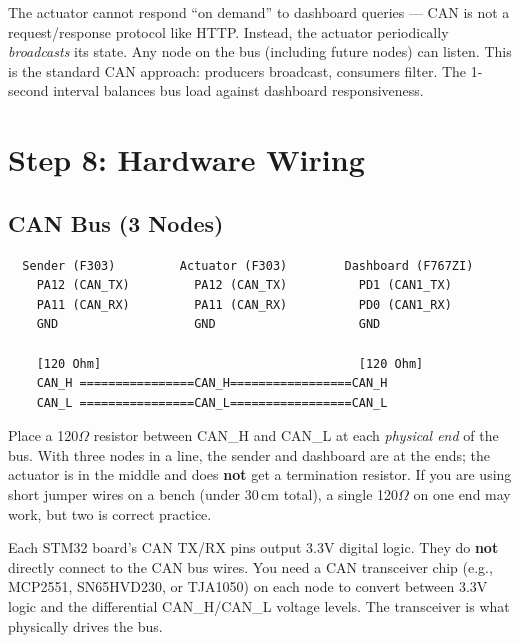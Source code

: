 \documentclass[11pt,a4paper]{article}
\begin{document}
\begin{infobox}
The actuator cannot respond ``on demand'' to dashboard queries --- CAN is not a request/response protocol like HTTP. Instead, the actuator periodically \emph{broadcasts} its state. Any node on the bus (including future nodes) can listen. This is the standard CAN approach: producers broadcast, consumers filter. The 1-second interval balances bus load against dashboard responsiveness.
\end{infobox}

\newpage

\section{Step 8: Hardware Wiring}

\subsection{CAN Bus (3 Nodes)}

\begin{verbatim}
  Sender (F303)         Actuator (F303)        Dashboard (F767ZI)
    PA12 (CAN_TX)         PA12 (CAN_TX)          PD1 (CAN1_TX)
    PA11 (CAN_RX)         PA11 (CAN_RX)          PD0 (CAN1_RX)
    GND                   GND                    GND

    [120 Ohm]                                    [120 Ohm]
    CAN_H ================CAN_H=================CAN_H
    CAN_L ================CAN_L=================CAN_L
\end{verbatim}

\begin{warnbox}
Place a 120$\Omega$ resistor between CAN\_H and CAN\_L at each \emph{physical end} of the bus. With three nodes in a line, the sender and dashboard are at the ends; the actuator is in the middle and does \textbf{not} get a termination resistor. If you are using short jumper wires on a bench (under 30\,cm total), a single 120$\Omega$ on one end may work, but two is correct practice.
\end{warnbox}

\begin{infobox}
Each STM32 board's CAN TX/RX pins output 3.3V digital logic. They do \textbf{not} directly connect to the CAN bus wires. You need a CAN transceiver chip (e.g., MCP2551, SN65HVD230, or TJA1050) on each node to convert between 3.3V logic and the differential CAN\_H/CAN\_L voltage levels. The transceiver is what physically drives the bus.
\end{infobox}
\end{document}
